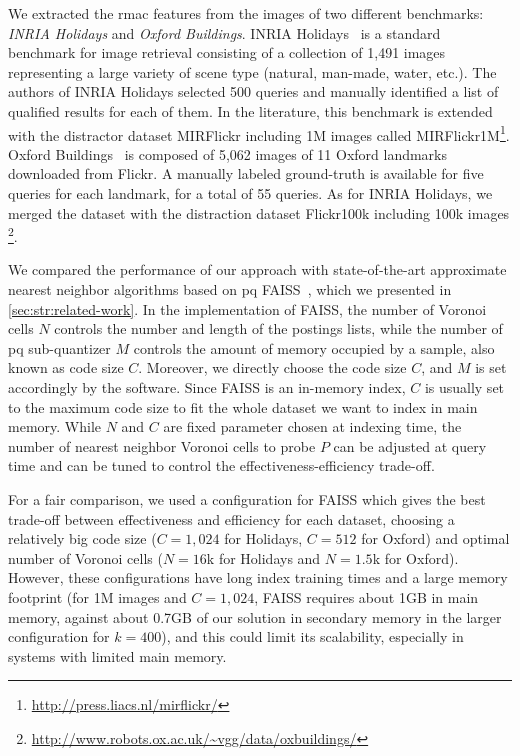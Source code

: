 We extracted the \gls{rmac} features from the images of two different benchmarks: \emph{INRIA Holidays} and \emph{Oxford Buildings}.
INRIA Holidays~\cite{jegou2008hamming} is a standard benchmark for image retrieval consisting of a collection of 1,491 images representing a large variety of scene type (natural, man-made, water, etc.).
The authors of INRIA Holidays selected 500 queries and manually identified a list of qualified results for each of them.
In the literature, this benchmark is extended with the distractor dataset MIRFlickr including 1M images called MIRFlickr1M\footnote{\url{http://press.liacs.nl/mirflickr/}}.
Oxford Buildings~\cite{philbin2007object} is composed of 5,062 images of 11 Oxford landmarks downloaded from Flickr.
A manually labeled ground-truth is available for five queries for each landmark, for a total of 55 queries.
As for INRIA Holidays, we merged the dataset with the distraction dataset Flickr100k including 100k images \footnote{\url{http://www.robots.ox.ac.uk/~vgg/data/oxbuildings/}}.

We compared the performance of our approach with state-of-the-art approximate nearest neighbor algorithms based on \gls{pq} FAISS~\cite{johnson2017billion}, which we presented in \ref{sec:str:related-work}.
In the implementation of FAISS, the number of Voronoi cells $N$ controls the number and length of the postings lists, while the number of \gls{pq} sub-quantizer $M$ controls the amount of memory occupied by a sample, also known as code size $C$.
Moreover, we directly choose the code size $C$, and $M$ is set accordingly by the software.
Since FAISS is an in-memory index, $C$ is usually set to the maximum code size to fit the whole dataset we want to index in main memory.
While $N$ and $C$ are fixed parameter chosen at indexing time, the number of nearest neighbor Voronoi cells to probe $P$ can be adjusted at query time and can be tuned to control the effectiveness-efficiency trade-off.

For a fair comparison, we used a configuration for FAISS which gives the best trade-off between effectiveness and efficiency for each dataset, choosing a relatively big code size ($C=1,024$ for Holidays, $C=512$ for Oxford) and optimal number of Voronoi cells ($N = 16$k for Holidays and $N=1.5$k for Oxford).
However, these configurations have long index training times and a large memory footprint (for 1M images and $C=1,024$, FAISS requires about 1GB in main memory, against about 0.7GB of our solution in secondary memory in the larger configuration for $k=400$), and this could limit its scalability, especially in systems with limited main memory.

